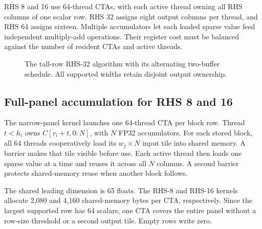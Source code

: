 \documentclass[10pt]{article}
\begin{document}
RHS 8 and 16 use 64-thread CTAs, with each active thread owning all RHS
columns of one scalar row. RHS 32 assigns eight output columns per thread,
and RHS 64 assigns sixteen. Multiple accumulators let each loaded sparse
value feed independent multiply-add operations. Their register cost must
be balanced against the number of resident CTAs and active threads.

\begin{figure}[!htbp]
\centering
{}
\caption{The tall-row RHS-32 algorithm with its alternating two-buffer
schedule. All supported widths retain disjoint output ownership.}
\label{fig:ownership}
\end{figure}

\subsection{Full-panel accumulation for RHS 8 and 16}
The narrow-panel kernel launches one 64-thread CTA per block row. Thread
\(t<h_i\) owns \(C[r_i+t,0:N]\), with \(N\) FP32 accumulators. For each
stored block, all 64 threads cooperatively load its \(w_j\times N\) input
tile into shared memory. A barrier makes that tile visible before use.
Each active thread then loads one sparse value at a time and reuses it
across all \(N\) columns. A second barrier protects shared-memory reuse
when another block follows.

The shared leading dimension is 65 floats. The RHS-8 and RHS-16 kernels
allocate 2,080 and 4,160 shared-memory bytes per CTA, respectively. Since
the largest supported row has 64 scalars, one CTA covers the entire panel
without a row-size threshold or a second output tile. Empty rows write zero.
\end{document}
